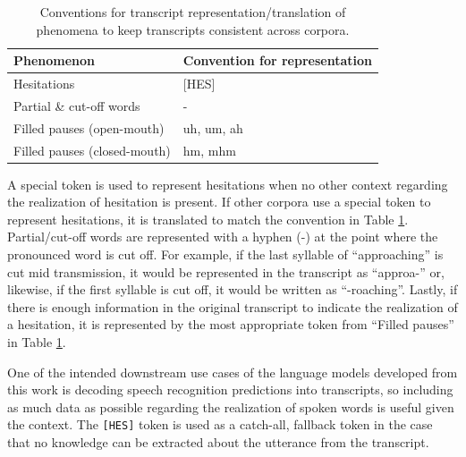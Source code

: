 \documentclass[12pt]{article}
\begin{document}
\begin{table}[!t]
    \centering
    \begin{tabular}{l l}
        \toprule
        Phenomenon                   & Convention for representation \\
        \midrule
        Hesitations                  & [HES]                         \\
        \midrule
        Partial \& cut-off words     & -                             \\
        \midrule
        Filled pauses (open-mouth)   & uh, um, ah                    \\
        \midrule
        Filled pauses (closed-mouth) & hm, mhm                       \\
        \bottomrule
    \end{tabular}
    \caption{Conventions for transcript representation/translation of phenomena to keep transcripts consistent across corpora.}
    \label{tab:phenomena_conventions}
\end{table}

A special token is used to represent hesitations when no other context regarding the realization of hesitation is present. If other corpora use a
special token to represent hesitations, it is translated to match the convention in Table \ref{tab:phenomena_conventions}. Partial/cut-off words
are represented with a hyphen (-) at the point where the pronounced word is cut off. For example, if the last syllable of ``approaching'' is cut
mid transmission, it would be represented in the transcript as ``approa-'' or, likewise, if the first syllable is cut off, it would be written as
``-roaching''. Lastly, if there is enough information in the original transcript to indicate the realization of a hesitation, it is represented by
the most appropriate token from ``Filled pauses'' in Table \ref{tab:phenomena_conventions}.

One of the intended downstream use cases of the language models developed from this work is decoding speech recognition predictions into transcripts,
so including as much data as possible regarding the realization of spoken words is useful given the context. The \lstinline|[HES]| token is used as a
catch-all, fallback token in the case that no knowledge can be extracted about the utterance from the transcript.
\end{document}
